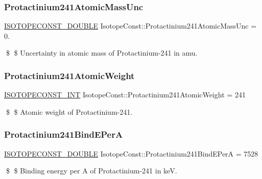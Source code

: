 \subsubsection{\texorpdfstring{Protactinium241\+Atomic\+Mass\+Unc}{Protactinium241AtomicMassUnc}}
{\footnotesize\ttfamily \mbox{\hyperlink{group___isotope_const-_macros_ga8f45a7272ce02c0b4c65c44636ed719a}{I\+S\+O\+T\+O\+P\+E\+C\+O\+N\+S\+T\+\_\+\+D\+O\+U\+B\+LE}} Isotope\+Const\+::\+Protactinium241\+Atomic\+Mass\+Unc = 0.}

\$ \$ Uncertainty in atomic mass of Protactinium-\/241 in amu. \mbox{\label{group___isotope_const-_protactinium-_pa241_gad6c15872b7ec3eb84331a6369505485d}} 
\subsubsection{\texorpdfstring{Protactinium241\+Atomic\+Weight}{Protactinium241AtomicWeight}}
{\footnotesize\ttfamily \mbox{\hyperlink{group___isotope_const-_macros_ga5f18360b3e99483a35c32d789e62621c}{I\+S\+O\+T\+O\+P\+E\+C\+O\+N\+S\+T\+\_\+\+I\+NT}} Isotope\+Const\+::\+Protactinium241\+Atomic\+Weight = 241}

\$ \$ Atomic weight of Protactinium-\/241. \mbox{\label{group___isotope_const-_protactinium-_pa241_gaa952e80a916d29ce1665abb9a350a761}} 
\subsubsection{\texorpdfstring{Protactinium241\+Bind\+E\+PerA}{Protactinium241BindEPerA}}
{\footnotesize\ttfamily \mbox{\hyperlink{group___isotope_const-_macros_ga8f45a7272ce02c0b4c65c44636ed719a}{I\+S\+O\+T\+O\+P\+E\+C\+O\+N\+S\+T\+\_\+\+D\+O\+U\+B\+LE}} Isotope\+Const\+::\+Protactinium241\+Bind\+E\+PerA = 7528}

\$ \$ Binding energy per A of Protactinium-\/241 in keV. \mbox{\label{group___isotope_const-_protactinium-_pa241_gadb42a8323f5452599d05926da706da08}} 

